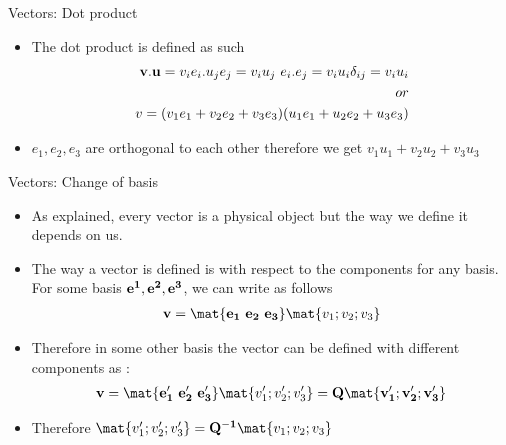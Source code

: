	\begin{frame}{Vectors: Dot product}
		\begin{itemize}
			\item The dot product is defined as such 
			\begin{equation}
			\begin{aligned}
				\mathbf{v.u} = v_ie_i . u_je_j = v_iu_j~e_i.e_j = v_iu_i \delta_{ij} = v_iu_i \\ or \\
				v = (v_1e_1 + v_2e_2 + v_3e_3)(u_1e_1 + u_2e_2 + u_3e_3)\\
			\end{aligned}
			\end{equation}

			\item $e_1,e_2,e_3$ are orthogonal to each other therefore we get $v_1u_1 + v_2u_2+v_3u_3$
		\end{itemize}
	\end{frame}


	\begin{frame}{Vectors: Change of basis}
	\begin{itemize}
		\item As explained, every vector is a physical object but the way we define it depends on us.
		\item The way a vector is defined is with respect to the components for any basis. For some basis $\mathbf{e^1, e^2, e^3}$, we can write as follows
		\begin{align*}
		\ve{v} = \mat{\ve{e_1~e_2~e_3}}\mat{v_1;v_2;v_3} 
		\end{align*}
		\item Therefore in some other basis the vector can be defined with different components as : 
		\begin{align*}
		\ve{v} =\mat{\ve{e'_1~e'_2~e'_3}}\mat{v'_1;v'_2;v'_3} = \ve{Q \mat{v'_1;v'_2;v'_3}}		
		\end{align*}
		\item Therefore $\mat{v'_1;v'_2;v'_3} = \ve{Q^{-1}}\mat{v_1;v_2;v_3}$
		
 
	\end{itemize}
	\end{frame}


